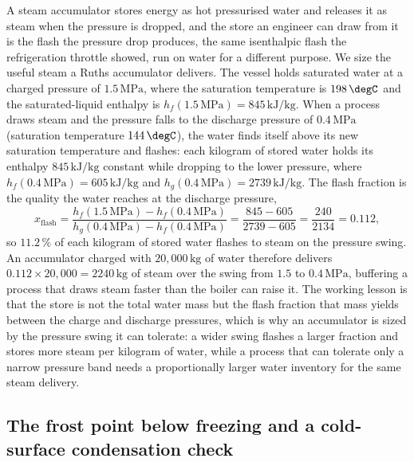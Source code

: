 A steam accumulator stores energy as hot pressurised water and releases it as
steam when the pressure is dropped, and the store an engineer can draw from it
is the flash the pressure drop produces, the same isenthalpic flash the
refrigeration throttle showed, run on water for a different purpose. We size
the useful steam a Ruths accumulator delivers. The vessel holds saturated
water at a charged pressure of $1.5\,\text{MPa}$, where the saturation
temperature is $198\,\degC$ and the saturated-liquid enthalpy is $h_f(1.5\,
\text{MPa}) = 845\,\text{kJ}/\text{kg}$. When a process draws steam and the
pressure falls to the discharge pressure of $0.4\,\text{MPa}$ (saturation
temperature $144\,\degC$), the water finds itself above its new saturation
temperature and flashes: each kilogram of stored water holds its enthalpy
$845\,\text{kJ}/\text{kg}$ constant while dropping to the lower pressure,
where $h_f(0.4\,\text{MPa}) = 605\,\text{kJ}/\text{kg}$ and $h_g(0.4\,
\text{MPa}) = 2739\,\text{kJ}/\text{kg}$. The flash fraction is the quality
the water reaches at the discharge pressure,
\[
x_{\text{flash}} = \frac{h_f(1.5\,\text{MPa}) - h_f(0.4\,\text{MPa})}{h_g(0.4
\,\text{MPa}) - h_f(0.4\,\text{MPa})} = \frac{845 - 605}{2739 - 605} =
\frac{240}{2134} = 0.112,
\]
so $11.2\,\%$ of each kilogram of stored water flashes to steam on the pressure
swing. An accumulator charged with $20{,}000\,\text{kg}$ of water therefore
delivers $0.112\times 20{,}000 = 2240\,\text{kg}$ of steam over the swing from
$1.5$ to $0.4\,\text{MPa}$, buffering a process that draws steam faster than the
boiler can raise it. The working lesson is that the store is not the total water
mass but the flash fraction that mass yields between the charge and discharge
pressures, which is why an accumulator is sized by the pressure swing it can
tolerate: a wider swing flashes a larger fraction and stores more steam per
kilogram of water, while a process that can tolerate only a narrow pressure
band needs a proportionally larger water inventory for the same steam delivery.

\subsection{The frost point below freezing and a cold-surface condensation
check}

